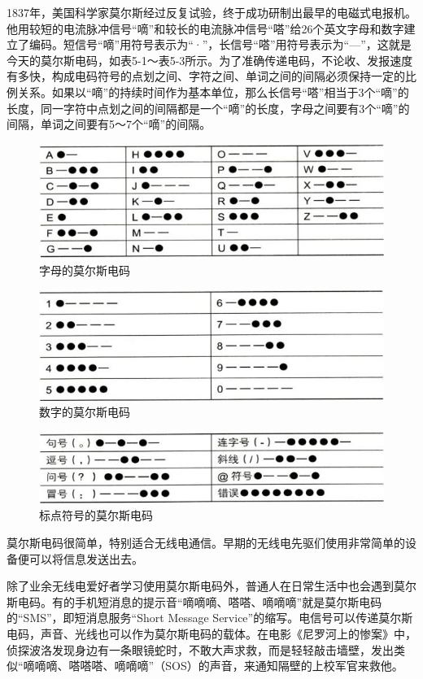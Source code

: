 \documentclass[12pt,UTF8]{ctexbook}
\begin{document}
1837年，美国科学家莫尔斯经过反复试验，终于成功研制出最早的电磁式电报机。他用较短的电流脉冲信号“嘀”和较长的电流脉冲信号“嗒”给26个英文字母和数字建立了编码。短信号“嘀”用符号表示为“·”，长信号“嗒”用符号表示为“—”，这就是今天的莫尔斯电码，如表5-1～表5-3所示。为了准确传递电码，不论收、发报速度有多快，构成电码符号的点划之间、字符之间、单词之间的间隔必须保持一定的比例关系。如果以“嘀”的持续时间作为基本单位，那么长信号“嗒”相当于3个“嘀”的长度，同一字符中点划之间的间隔都是一个“嘀”的长度，字母之间要有3个“嘀”的间隔，单词之间要有5～7个“嘀”的间隔。

\begin{figure}[htbp]
	\centering
	\includegraphics[width=0.7\linewidth]{60}
	\caption{字母的莫尔斯电码}
	\label{fig:1}
\end{figure}

\begin{figure}[htbp]
	\centering
	\includegraphics[width=0.7\linewidth]{61}
	\caption{数字的莫尔斯电码}
	\label{fig:1}
\end{figure}

\begin{figure}[htbp]
	\centering
	\includegraphics[width=0.7\linewidth]{62}
	\caption{标点符号的莫尔斯电码}
	\label{fig:1}
\end{figure}

莫尔斯电码很简单，特别适合无线电通信。早期的无线电先驱们使用非常简单的设备便可以将信息发送出去。

除了业余无线电爱好者学习使用莫尔斯电码外，普通人在日常生活中也会遇到莫尔斯电码。有的手机短消息的提示音“嘀嘀嘀、嗒嗒、嘀嘀嘀”就是莫尔斯电码的“SMS”，即短消息服务“Short Message Service”的缩写。电信号可以传递莫尔斯电码，声音、光线也可以作为莫尔斯电码的载体。在电影《尼罗河上的惨案》中，侦探波洛发现身边有一条眼镜蛇时，不敢大声求救，而是轻轻敲击墙壁，发出类似“嘀嘀嘀、嗒嗒嗒、嘀嘀嘀”（SOS）的声音，来通知隔壁的上校军官来救他。
\end{document}
